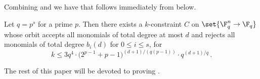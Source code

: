 Combining 
and 
we have that 
follows immediately from  below.

\begin{theorem}\label{thm:main2}
Let $q=p^s$ for a prime $p$.
Then there exists a $k$-constraint $C$ on $\set{\F_q^n \to \F_q}$ whose orbit
accepts all monomials
of total degree at most $d$
and rejects all
monomials of total degree $b_i(d)$ for $0 \leq i \leq s$,
for \[k \leq 3q^4 \cdot \big(2^{p-1}+p-1\big)^{(d+1)/(q(p-1))} \cdot q^{(d+1)/q}\,.\]
\end{theorem}

The rest of this paper will be devoted to proving .

